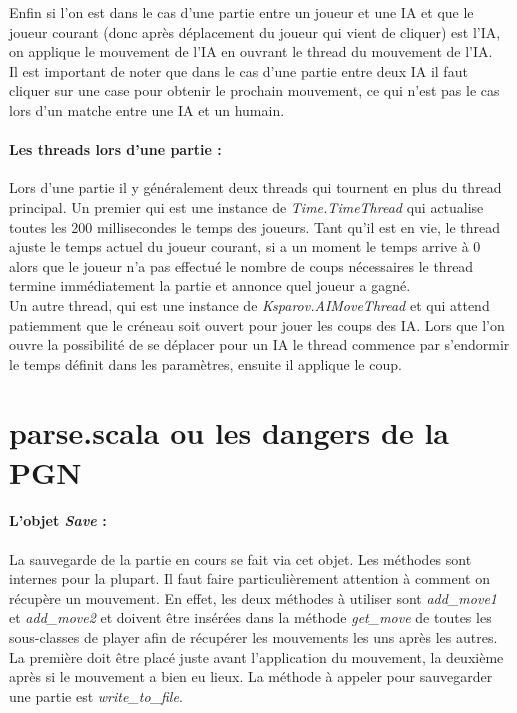 \documentclass[a4paper]{article}
\begin{document}
Enfin si l'on est dans le cas d'une partie entre un joueur et une IA et que le joueur courant (donc après déplacement du joueur qui vient de cliquer) est l'IA, on applique le mouvement de l'IA en ouvrant le thread du mouvement de l'IA. \\ 

Il est important de noter que dans le cas d'une partie entre deux IA il faut cliquer sur une case pour obtenir le prochain mouvement, ce qui n'est pas le cas lors d'un matche entre une IA et un humain. 

\paragraph{Les threads lors d'une partie :}Lors d'une partie il y généralement deux threads qui tournent en plus du thread principal. Un premier qui est une instance de \textit{Time.TimeThread} qui actualise toutes les 200 millisecondes le temps des joueurs. Tant qu'il est en vie, le thread ajuste le temps actuel du joueur courant, si a un moment le temps arrive à 0 alors que le joueur n'a pas effectué le nombre de coups nécessaires le thread termine immédiatement la partie et annonce quel joueur a gagné. \\

Un autre thread, qui est une instance de \textit{Ksparov.AIMoveThread} et qui attend patiemment que le créneau soit ouvert pour jouer les coups des IA. Lors que l'on ouvre la possibilité de se déplacer pour un IA le thread commence par s'endormir le temps définit dans les paramètres, ensuite il applique le coup. 

\section{parse.scala ou les dangers de la PGN}
\label{parse}

\paragraph{L'objet \textit{Save} :} La sauvegarde de la partie en cours se fait via cet objet. Les méthodes sont internes pour la plupart. Il faut faire particulièrement attention à comment on récupère un mouvement. En effet, les deux méthodes à utiliser sont \textit{add\_move1} et \textit{add\_move2} et doivent être insérées dans la méthode \textit{get\_move} de toutes les sous-classes de player afin de récupérer les mouvements les uns après les autres. La première doit être placé juste avant l'application du mouvement, la deuxième après si le mouvement a bien eu lieux. La méthode à appeler pour sauvegarder une partie est \textit{write\_to\_file}. \\
\end{document}
